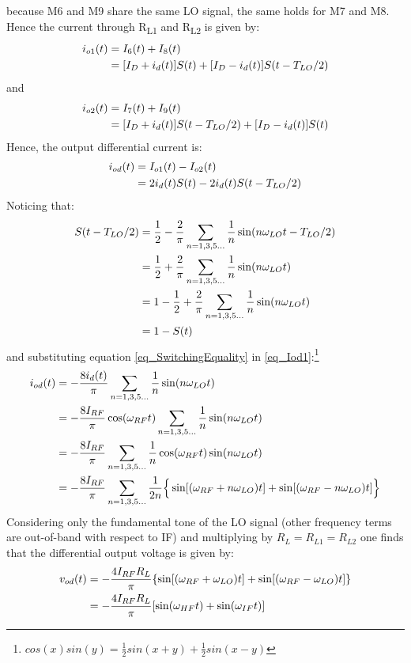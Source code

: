because M6 and M9 share the same LO signal, the same holds for M7 and M8. 
Hence the current through R\textsubscript{L1} and R\textsubscript{L2} is given by:
\begin{align}
i_{o1}(t) &= I_6(t)+I_8(t) \notag \\
&=[I_D + i_d(t)]S(t)+[I_D - i_d(t)]S(t-T_{LO}/2) 
\end{align}
and 
\begin{align}
i_{o2}(t) &= I_7(t)+I_9(t) \notag \\
&=[I_D + i_d(t)]S(t-T_{LO}/2)+[I_D - i_d(t)]S(t) 
\end{align}
Hence, the output differential current is:
\begin{align}
\label{eq_Iod1}
i_{od}(t) &= I_{o1}(t)-I_{o2}(t) \notag \\
&=2i_d(t) S(t)-2i_d(t)S(t-T_{LO}/2) 
\end{align}
Noticing that:
\begin{align}
\label{eq_SwitchingEquality}
S(t-T_{LO}/2) &=\frac{1}{2}-\frac{2}{\pi} \sum_{n=1,3,5 \dots}^{} \frac{1}{n}\sin(n\omega_{LO} t-T_{LO}/2) \notag \\
&= \frac{1}{2}+\frac{2}{\pi} \sum_{n=1,3,5 \dots}^{} \frac{1}{n}\sin(n\omega_{LO} t) \notag \\
& =1- \frac{1}{2}+\frac{2}{\pi} \sum_{n=1,3,5 \dots}^{} \frac{1}{n}\sin(n\omega_{LO} t) \notag \\
&= 1 - S(t)
\end{align}
and substituting equation \ref{eq_SwitchingEquality} in \ref{eq_Iod1}:\footnote{$cos(x)sin(y)=\frac{1}{2}sin(x+y)+\frac{1}{2}sin(x-y)$}
\begin{align}
\label{eq_Iod2}
i_{od}(t) &= -\frac{8i_d(t)}{\pi}\sum_{n=1,3,5 \dots}^{} \frac{1}{n}\sin(n\omega_{LO} t) \notag \\
&= -\frac{8I_{RF}}{\pi}\cos(\omega_{RF}t)\sum_{n=1,3,5 \dots}^{} \frac{1}{n}\sin(n\omega_{LO} t) \notag \\
&= -\frac{8I_{RF}}{\pi}\sum_{n=1,3,5 \dots}^{} \frac{1}{n}\cos(\omega_{RF}t)\sin(n\omega_{LO} t) \notag \\
&= -\frac{8I_{RF}}{\pi}\sum_{n=1,3,5 \dots}^{} \frac{1}{2n}\Big\{ \sin[(\omega_{RF}+n\omega_{LO})t]+\sin[(\omega_{RF}-n\omega_{LO}) t]\Big\}
\end{align}
Considering only the fundamental tone of the LO signal (other frequency terms are out-of-band with respect to IF) and multiplying by $R_L=R_{L1}=R_{L2}$ one finds that the differential output voltage is given by:
\begin{align}
v_{od}(t)& = -\frac{4I_{RF}R_L}{\pi}\{\sin[(\omega_{RF}+\omega_{LO}) t]+\sin[(\omega_{RF}-\omega_{LO}) t]\} \notag \\
& = -\frac{4I_{RF}R_L}{\pi}[\sin(\omega_{HF} t)+\sin(\omega_{IF} t)]
\end{align}
